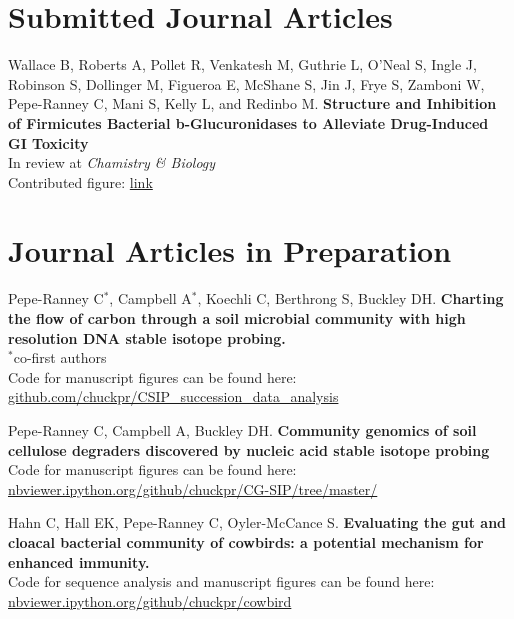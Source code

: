 \documentclass[letterpaper]{article}
\renewenvironment{itemize}{
  \begin{list}{}{
    \setlength{\leftmargin}{1.5em}
  }
}{
  \end{list}
}
\begin{document}
\section*{Submitted Journal Articles}
\begin{itemize}
\item Wallace B, Roberts A, Pollet R, Venkatesh M, 
    Guthrie L, O'Neal S, Ingle J, Robinson S, Dollinger M, Figueroa E, 
    McShane S, Jin J, Frye S, Zamboni W, Pepe-Ranney C, Mani S, Kelly
    L, and Redinbo M. \textbf{Structure and Inhibition of Firmicutes
    Bacterial b-Glucuronidases to Alleviate Drug-Induced GI Toxicity}\\
    In review at \textit{Chamistry \& Biology}\\
    Contributed figure: \href{http://github.com/chuckpr/loop_tree}{link}
\end{itemize}
\section*{Journal Articles in Preparation}
\begin{itemize}
\item Pepe-Ranney C$^{*}$, Campbell A$^{*}$, Koechli C, Berthrong S, 
    Buckley DH. \textbf{Charting the flow of carbon through a soil
        microbial community with high resolution DNA stable isotope
        probing.}\\
    {\small$^{*}$co-first authors}\\
    Code for manuscript figures can be found here:\\
    \href{https://github.com/chuckpr/CSIP_succession_data_analysis}
    {github.com/chuckpr/CSIP\_succession\_data\_analysis}
\item Pepe-Ranney C, Campbell A, Buckley DH. 
    \textbf{Community genomics of soil cellulose degraders discovered by nucleic acid stable isotope probing}\\
    Code for manuscript figures can be found here:\\
    \href{http://nbviewer.ipython.org/github/chuckpr/CG-SIP}
    {nbviewer.ipython.org/github/chuckpr/CG-SIP/tree/master/}
\item Hahn C, Hall EK, Pepe-Ranney C, Oyler-McCance S.
    \textbf{Evaluating the gut and cloacal bacterial community of
    cowbirds: a potential mechanism for enhanced immunity.}\\
    Code for sequence analysis and manuscript figures can be found here:\\
    \href{http://nbviewer.ipython.org/github/chuckpr/cowbird}
    {nbviewer.ipython.org/github/chuckpr/cowbird}
\end{itemize}
\end{document}
